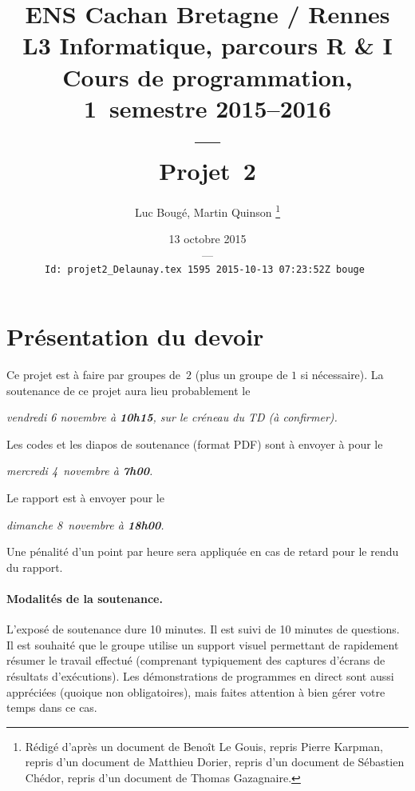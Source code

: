 \documentclass{../../../LaTeX/tdsimple}
\begin{document}
\title{%
  ENS Cachan Bretagne / Rennes\\
  L3 Informatique, parcours R \& I\\
  Cours de programmation, 1\ier\ semestre 2015--2016\\
  ---\\
  Projet~2\\
}


\author{Luc Bougé, Martin Quinson%
  \footnote{Rédigé d'après un document de Benoît Le Gouis, repris
    Pierre Karpman, repris d'un document de Matthieu Dorier, repris
    d'un document de Sébastien Chédor, repris d'un document de Thomas
    Gazagnaire.}}

\date{13 octobre 2015\\
  ---\\
  \lstinline[language={}]%
  $Id: projet2_Delaunay.tex 1595 2015-10-13 07:23:52Z bouge $%
}


\maketitle

\section*{Présentation du devoir}

Ce projet est à faire par groupes de~$2$ (plus un groupe de $1$ si
nécessaire).  La soutenance de ce projet aura lieu probablement le
\begin{center}
  \sl vendredi 6 novembre à \textbf{10h15}, sur le créneau du TD (à confirmer).
\end{center}
Les codes et les diapos de soutenance (format PDF) sont à envoyer à
\href{mailto:martin.quinson@ens-rennes.fr}{}
pour le
\begin{center}
  \sl mercredi 4~novembre à \textbf{7h00}.
\end{center}
Le rapport est à envoyer pour le
\begin{center}
  \sl dimanche 8~novembre à \textbf{18h00}.
\end{center}
Une pénalité d'un point par heure sera appliquée en cas de retard pour
le rendu du rapport.

\paragraph{Modalités de la soutenance.}
L'exposé de soutenance dure 10 minutes. Il est suivi de 10 minutes de questions.  Il
est souhaité que le groupe utilise un support visuel permettant de
rapidement résumer le travail effectué (comprenant typiquement des
captures d'écrans de résultats d'exécutions).  Les démonstrations de
programmes en direct sont aussi appréciées (quoique non obligatoires),
mais faites attention à bien gérer votre temps dans ce cas.
\end{document}
